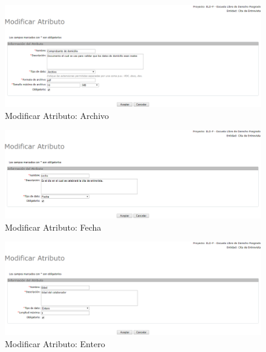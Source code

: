 \begin{enumerate}
			\begin{figure}[H]
				\begin{center}
					\includegraphics[scale=0.5]{roles/lider/entidades/atributos/pantallas/IU12-1-2AmodificarAtributo}
					\caption{Modificar Atributo: Archivo}
					\label{fig:modificarAtributoA}
				\end{center}
			\end{figure}
			
			\begin{figure}[H]
				\begin{center}
					\includegraphics[scale=0.5]{roles/lider/entidades/atributos/pantallas/IU12-1-2BmodificarAtributo}
					\caption{Modificar Atributo: Fecha}
					\label{fig:modificarAtributoB}
				\end{center}
			\end{figure}
			
			\begin{figure}[H]
				\begin{center}
					\includegraphics[scale=0.5]{roles/lider/entidades/atributos/pantallas/IU12-1-2CmodificarAtributo}
					\caption{Modificar Atributo: Entero}
					\label{fig:modificarAtributoC}
				\end{center}
			\end{figure}
			

\end{enumerate}
